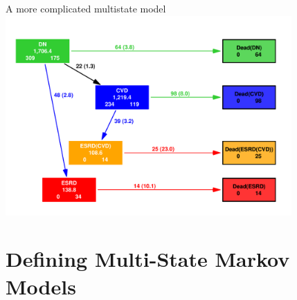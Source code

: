 \begin{frame}{A more complicated multistate model}
\vspace*{-1em}
\includegraphics[width=0.82\textwidth]{./GbAd-states.pdf}
\end{frame}

\section{Defining Multi-State Markov Models}




